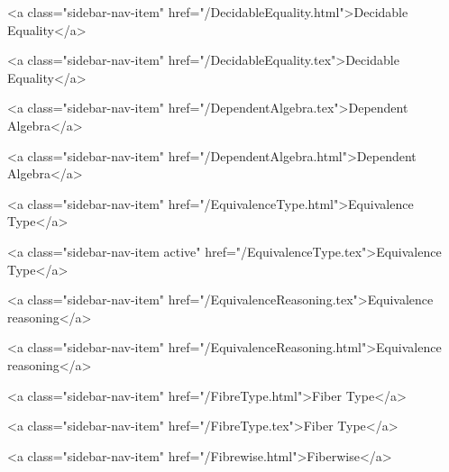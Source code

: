       
    
      
        
          <a class="sidebar-nav-item" href="/DecidableEquality.html">Decidable Equality</a>
        
      
    
      
        
          <a class="sidebar-nav-item" href="/DecidableEquality.tex">Decidable Equality</a>
        
      
    
      
        
          <a class="sidebar-nav-item" href="/DependentAlgebra.tex">Dependent Algebra</a>
        
      
    
      
        
          <a class="sidebar-nav-item" href="/DependentAlgebra.html">Dependent Algebra</a>
        
      
    
      
        
          <a class="sidebar-nav-item" href="/EquivalenceType.html">Equivalence Type</a>
        
      
    
      
        
          <a class="sidebar-nav-item active" href="/EquivalenceType.tex">Equivalence Type</a>
        
      
    
      
        
          <a class="sidebar-nav-item" href="/EquivalenceReasoning.tex">Equivalence reasoning</a>
        
      
    
      
        
          <a class="sidebar-nav-item" href="/EquivalenceReasoning.html">Equivalence reasoning</a>
        
      
    
      
        
          <a class="sidebar-nav-item" href="/FibreType.html">Fiber Type</a>
        
      
    
      
        
          <a class="sidebar-nav-item" href="/FibreType.tex">Fiber Type</a>
        
      
    
      
        
          <a class="sidebar-nav-item" href="/Fibrewise.html">Fiberwise</a>
        
